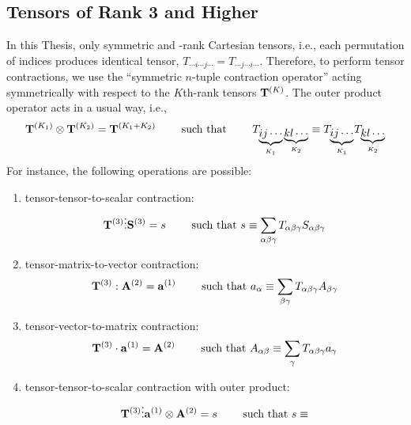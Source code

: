\documentclass[a4paper,titlepage,twoside,fleqn,12pt]{book}
\begin{document}
\begin{appendices}
\section{Tensors of Rank 3 and Higher}

In this Thesis, only symmetric  and \hyp{}rank Cartesian tensors,
i.e., each permutation of indices produces identical tensor, 
$T_{\cdots i\cdots j\cdots} = T_{\cdots j\cdots i\cdots}$.
Therefore, to perform tensor contractions, 
we use the ``symmetric $n$-tuple contraction operator''
acting symmetrically
with respect to the $K$th-rank tensors ${\bf T}^{(K)}$.
The outer product operator acts in a usual way, i.e.,
%
\begin{equation}
 {\bf T}^{(K_1)} \otimes {\bf T}^{(K_2)}  = {\bf T}^{(K_1+K_2)}
 \qquad\text{ such that } 
 \qquad T_{\underbrace{ij\cdots}_{K_1}\underbrace{kl\cdots}_{K_2}} \equiv 
 T_{\underbrace{ij\cdots}_{K_1}} T_{\underbrace{kl\cdots}_{K_2}} 
\end{equation}
%
For instance, the following operations are possible:
%
\begin{enumerate}
 \item tensor\hyp{}tensor\hyp{}to\hyp{}scalar contraction:
   \begin{equation}
     {\bf T}^{(3)} \vdots {\bf S}^{(3)}  = s
     \qquad\text{ such that } 
     s \equiv 
     \sum_{\alpha\beta\gamma} T_{\alpha\beta\gamma} S_{\alpha\beta\gamma} 
   \end{equation}
 \item tensor\hyp{}matrix\hyp{}to\hyp{}vector contraction:
   \begin{equation}
     {\bf T}^{(3)} : {\bf A}^{(2)}  = {\bf a}^{(1)}
     \qquad\text{ such that } 
     a_\alpha \equiv 
     \sum_{\beta\gamma} T_{\alpha\beta\gamma} A_{\beta\gamma} 
   \end{equation}
 \item tensor\hyp{}vector\hyp{}to\hyp{}matrix contraction:
   \begin{equation}
     {\bf T}^{(3)} \cdot {\bf a}^{(1)}  = {\bf A}^{(2)}
     \qquad\text{ such that } 
     A_{\alpha\beta} \equiv 
     \sum_{\gamma} T_{\alpha\beta\gamma} a_{\gamma} 
   \end{equation}
 \item tensor\hyp{}tensor\hyp{}to\hyp{}scalar contraction with outer product:
   \begin{equation}
     {\bf T}^{(3)} \vdots {\bf a}^{(1)} \otimes {\bf A}^{(2)}  = s
     \qquad\text{ such that } 
     s \equiv 

\end{equation}
\end{enumerate}
\end{appendices}
\end{document}
